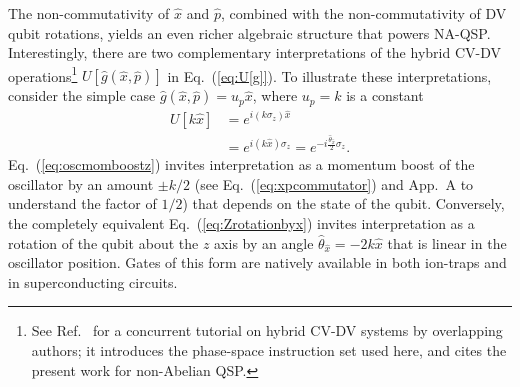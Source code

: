 \documentclass[aps,prx,showpacs,notitlepage,twocolumn,superscriptaddress,nofootinbib,preprintnumbers,floatfix,10pt, longbibliography]{revtex4-2}
\begin{document}
The non-commutativity of $\hat x$ and $\hat p$, combined with the non-commutativity of DV qubit rotations, yields an even richer algebraic structure that powers NA-QSP.
Interestingly, there are two complementary interpretations of 
the hybrid CV-DV operations\footnote{See Ref.~\cite{ISA} for a concurrent tutorial on hybrid CV-DV systems by overlapping authors; it introduces the phase-space instruction set used here, and cites the present work for non-Abelian QSP.} $U[\hat g(\hat x, \hat p)]$ in Eq.~(\ref{eq:U[g]}).  To illustrate these interpretations, consider the simple case $\hat g(\hat x,\hat p) = u_p\hat x$, where $u_p=k$ is a constant
\begin{align}
    U[k\hat x]&=e^{i(k \sigma_z)\hat x}\label{eq:oscmomboostz}\\
    &=e^{i(k \hat x)\sigma_z}=e^{-i\frac{\hat\theta_{\hat x}}{2}\sigma_z}.\label{eq:Zrotationbyx}
\end{align}
 Eq.~(\ref{eq:oscmomboostz}) invites interpretation as a momentum boost of the oscillator by an amount $\pm k/2$ (see Eq.~(\ref{eq:xpcommutator}) and App.~A to understand the factor of $1/2$) that depends on the state of the qubit.  Conversely, the completely equivalent Eq.~(\ref{eq:Zrotationbyx}) invites interpretation as a rotation of the qubit about the $z$ axis by an angle $\hat\theta_{\hat x}=-2k\hat x$ that is linear in the oscillator position.  Gates of this form are natively available \cite{ISA} in both ion-traps and in superconducting circuits.
\end{document}
